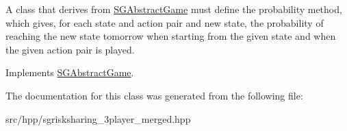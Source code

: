 A class that derives from \hyperlink{classSGAbstractGame}{S\+G\+Abstract\+Game} must define the probability method, which gives, for each state and action pair and new state, the probability of reaching the new state tomorrow when starting from the given state and when the given action pair is played. 

Implements \hyperlink{classSGAbstractGame_a416b31d5020b75de49447ce4f7783b98}{S\+G\+Abstract\+Game}.



The documentation for this class was generated from the following file\+:\begin{DoxyCompactItemize}
\item 
src/hpp/sgrisksharing\+\_\+3player\+\_\+merged.\+hpp\end{DoxyCompactItemize}
